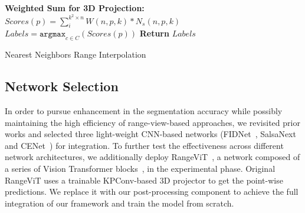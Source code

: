 \begin{algorithm}[t]
\begin{algorithmic}[1]
    \State \textbf{Weighted Sum for 3D Projection:}
        \Statex \hspace{1em} $Scores(p) = \sum_{i}^{k^2\times n} W(n,p, k) * N_s(n,p, k)$
    \Statex \hspace{1em} $Labels = \texttt{argmax}_{c\in C}(Scores(p))$
    \State \textbf{Return} $Labels$
    
    \end{algorithmic}
    	\caption{Nearest Neighbors Range Interpolation}\label{algo:NNRA}
\end{algorithm}
    

\subsection{Network Selection}
In order to pursue enhancement in the segmentation accuracy while possibly maintaining the high efficiency of range-view-based approaches, we revisited prior works and selected three light-weight CNN-based networks (FIDNet~\cite{zhao2021fidnet}, SalsaNext~\cite{cortinhal2020salsanext} and CENet~\cite{cheng2022cenet}) for integration. To further test the effectiveness across different network architectures, we additionally deploy RangeViT~\cite{ando2023rangevit}, a network composed of a series of Vision Transformer blocks~\cite{dosovitskiy2020image}, in the experimental phase. Original RangeViT uses a trainable KPConv-based 3D projector to get the point-wise predictions. We replace it with our post-processing component to achieve the full integration of our framework and train the model from scratch.










